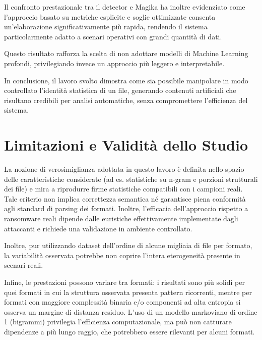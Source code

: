 \documentclass{report}
\begin{document}
\bigskip

Il confronto prestazionale tra il detector e Magika ha inoltre evidenziato come l'approccio basato
su metriche esplicite e soglie ottimizzate consenta un'elaborazione significativamente più rapida,
rendendo il sistema particolarmente adatto a scenari operativi con grandi quantità di dati.

Questo risultato rafforza la scelta di non adottare modelli di Machine Learning profondi, 
privilegiando invece un approccio più leggero e interpretabile.


\bigskip

In conclusione, il lavoro svolto dimostra come sia possibile manipolare 
in modo controllato l'identità statistica di un file,
generando contenuti artificiali che risultano credibili per analisi automatiche, senza compromettere l’efficienza del sistema. 


\section{Limitazioni e Validità dello Studio}

La nozione di verosimiglianza adottata in questo lavoro è definita nello spazio delle caratteristiche considerate
(ad es. statistiche su n-gram e porzioni strutturali dei file) e mira a riprodurre firme statistiche
compatibili con i campioni reali. Tale criterio non implica correttezza semantica né garantisce piena
conformità agli standard di parsing dei formati. Inoltre, l’efficacia dell’approccio rispetto a
ransomware reali dipende dalle euristiche effettivamente implementate dagli attaccanti e richiede
una validazione in ambiente controllato.

\bigskip

Inoltre, pur utilizzando dataset dell'ordine di alcune migliaia di file per formato, la variabilità osservata potrebbe 
non coprire l'intera eterogeneità presente in scenari reali.

\bigskip


Infine, le prestazioni possono variare tra formati: i risultati sono più solidi per quei formati in cui la struttura osservata presenta pattern ricorrenti, mentre per formati con maggiore complessità binaria e/o componenti ad alta entropia si osserva un margine di distanza residuo.
L'uso di un modello markoviano di ordine 1 (bigrammi) privilegia l'efficienza computazionale, ma può non catturare dipendenze a più lungo raggio, che potrebbero essere rilevanti per alcuni formati.
\end{document}
